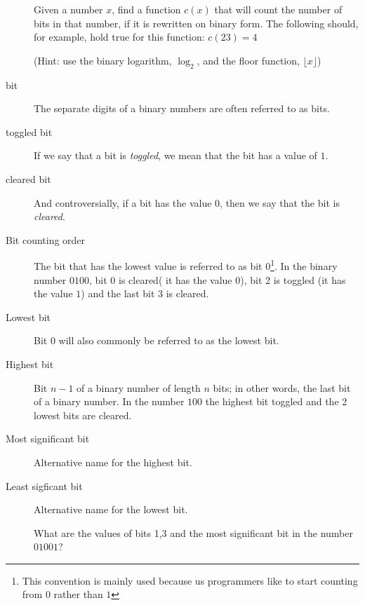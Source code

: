 \begin{description}
  \begin{Exercise}[label={count-bits-func}]
    Given a number $x$, find a function $c(x)$ that will count the
    number of bits in that number, if it is rewritten on binary
    form. The following should, for example, hold true for this
    function: $c(23) = 4$

    (Hint: use the binary logarithm, $\log_2$, and the floor function,
    $\lfloor x \rfloor$)

\end{Exercise}

\item[bit] The separate digits of a binary numbers are often referred
  to as bits.

\item[toggled bit] If we say that a bit is \textit{toggled}, we mean that
  the bit has a value of $1$.

\item[cleared bit] And controversially, if a bit has the value
  $0$, then we say that the bit is \textit{cleared}.

\item[Bit counting order] The bit that has the lowest value is
  referred to as bit 0\footnote{This convention is mainly used because
    us programmers like to start counting from $0$ rather than $1$}.
  In the binary number $0100$, bit 0 is cleared( it has the value
  $0$), bit 2 is toggled (it has the value $1$) and the last bit 3 is
  cleared.

\item[Lowest bit] Bit 0 will also commonly be referred to as the
  lowest bit.

\item[Highest bit] Bit $n - 1$ of a binary number of length $n$ bits;
  in other words, the last bit of a binary number. In the number $100$
  the highest bit toggled and the 2 lowest bits are cleared.

\item[Most significant bit] Alternative name for the highest bit.

\item[Least sigficant bit] Alternative name for the lowest bit.

\begin{Exercise}[label={bits-value-order}]
  What are the values of bits 1,3 and the most significant bit in the
  number $01001$?

\end{Exercise}


\end{description}
